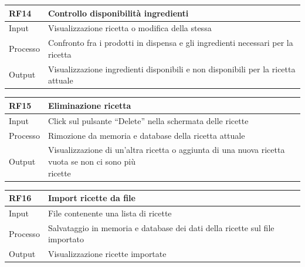 \documentclass{article}
\begin{document}
\begin{table}[H]
    \begin{flushleft}
      \begin{tabular}{l|l}
        \toprule
        \textbf{RF14} & \textbf{Controllo disponibilità ingredienti}\\
        \midrule
        Input & Visualizzazione ricetta o modifica della stessa\\
        Processo & Confronto fra i prodotti in dispensa e gli ingredienti necessari per la ricetta\\
        Output & Visualizzazione ingredienti disponibili e non disponibili per la ricetta attuale\\
        \bottomrule
      \end{tabular}
    \end{flushleft}
\end{table}

\begin{table}[H]
    \begin{flushleft}
      \begin{tabular}{l|l}
        \toprule
        \textbf{RF15} & \textbf{Eliminazione ricetta}\\
        \midrule
        Input & Click sul pulsante “Delete” nella schermata delle ricette\\
        Processo & Rimozione da memoria e database della ricetta attuale\\
        Output & \makecell{Visualizzazione di un’altra ricetta o aggiunta di una nuova ricetta vuota se non ci sono più \\ ricette}\\
        \bottomrule
      \end{tabular}
    \end{flushleft}
\end{table}

\begin{table}[H]
    \begin{flushleft}
      \begin{tabular}{l|l}
        \toprule
        \textbf{RF16} & \textbf{Import ricette da file}\\
        \midrule
        Input & File contenente una lista di ricette\\
        Processo & Salvataggio in memoria e database dei dati della ricette sul file importato\\
        Output & Visualizzazione ricette importate\\
        \bottomrule
      \end{tabular}
    \end{flushleft}
\end{table}
\end{document}
